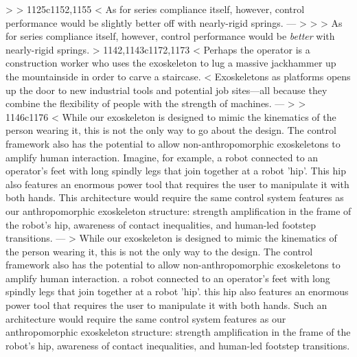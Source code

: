 > 
> 
1125c1152,1155
< As for series compliance itself, however, control performance would be slightly better off with nearly-rigid springs.
---
> 
> 
> As for series compliance itself, however, control performance would be \emph{better} with nearly-rigid springs.
> 
1142,1143c1172,1173
< Perhaps the operator is a construction worker who uses the exoskeleton to lug a massive jackhammer up the mountainside in order to carve a  staircase.
< Exoskeletons as platforms opens up the door to new industrial tools and potential job sites---all because they combine the flexibility of people with the strength of machines.
---
> 
> 
1146c1176
< While our exoskeleton is designed to mimic the kinematics of the person wearing it, this is not the only way to go about the design. The control framework also has the potential to allow non-anthropomorphic exoskeletons to amplify human interaction. Imagine, for example, a robot connected to an operator's feet with long spindly legs that join together at a robot 'hip'. This hip also features an enormous power tool that requires the user to manipulate it with both hands. This architecture would require the same control system features as our anthropomorphic exoskeleton structure: strength amplification in the frame of the robot's hip, awareness of contact inequalities, and human-led footstep transitions.
---
> While our exoskeleton is designed to mimic the kinematics of the person wearing it, this is not the only way to  the design. The control framework also has the potential to allow non-anthropomorphic exoskeletons to amplify human interaction.  a robot connected to an operator's feet with long spindly legs that join together at a robot 'hip'.  this hip also features an enormous power tool that requires the user to manipulate it with both hands. Such an architecture would require the same control system features as our anthropomorphic exoskeleton structure: strength amplification in the frame of the robot's hip, awareness of contact inequalities, and human-led footstep transitions.
